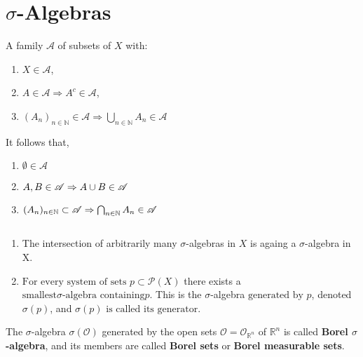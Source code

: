 \section{\(\sigma\)-Algebras}
\begin{definition}


    A family \(\mathscr{A}\) of subsets of \(X\) with:
    \begin{enumerate}[label=(\roman*)]
        \item \(X\in\mathscr{A}\), \label{ax:sigma1}
        \item \(A\in\mathscr{A} \Rightarrow A^c \in\mathscr{A}\), \label{ax:sigma2}
        \item \(\left( A_n \right)_{n\in\mathbb{N}} \in\mathscr{A} \Rightarrow \bigcup\limits_{n\in\mathbb{N}} A_n\in  \mathscr{A}\) 
    \end{enumerate}
\end{definition}


\begin{remark} It follows that, 
    \begin{enumerate}[label = (\roman*)]
        \item \( \emptyset\in \mathscr{A} \)
        \item \(A,B\in \mathscr{A} \Rightarrow A\cup B\in \mathscr{A}\)
        \item \((A_n)_{n\in\mathbb{N}}\subset \mathscr{A} \Rightarrow \bigcap_{n\in\mathbb{N}}A_n\in\mathscr{A} \)
    \end{enumerate}
\end{remark}

\begin{theorem}
    $\quad$ 

    \begin{enumerate}[label=(\roman*)]
        \item The intersection of arbitrarily many \(\sigma\)-algebras in \(X\) is againg a \(\sigma\)-algebra in X.
        \item \(\text{For every system of sets }p \subset \mathscr{P}(X)\) there exists a 
        \(\text{smallest} \sigma\text{-algebra containing} p. \) This is the \(\sigma\)-algebra
        \(\text{generated by } p\), denoted \(\sigma(p)\), and 
        \(\sigma(p) \text{ is called its generator}\).
    \end{enumerate}
\end{theorem}
\begin{definition}[Borel]
    The \(\sigma\)-algebra \(\sigma(\mathcal{O})\) generated by the open sets \(\mathcal{O} = \mathcal{O}_{\mathbb{R}^n}\) of $\mathbb{R}^n$
    is called \textbf{Borel $\sigma$-algebra}, and its members are called \textbf{Borel sets} or
    \textbf{Borel measurable sets}.
\end{definition}


